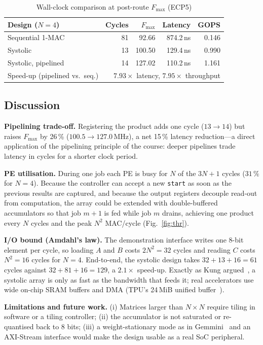 \documentclass[conference]{IEEEtran}
\begin{document}
\begin{table}[t]
\centering
\caption{Wall-clock comparison at post-route $F_{\max}$ (ECP5)}
\label{tab:wall}
\setlength{\tabcolsep}{3pt}
\begin{tabular}{@{}lrrrr@{}}
\toprule
Design ($N=4$) & Cycles & $F_{\max}$ & Latency & GOPS\\
\midrule
Sequential 1-MAC     & 81 & 92.66  & 874.2\,ns & 0.146\\
Systolic             & 13 & 100.50 & 129.4\,ns & 0.990\\
Systolic, pipelined  & 14 & 127.02 & 110.2\,ns & 1.161\\
\midrule
Speed-up (pipelined vs.\ seq.) & \multicolumn{4}{r}{$7.93\times$ latency, $7.95\times$ throughput}\\
\bottomrule
\end{tabular}
\end{table}

\subsection{Discussion}\label{sec:disc}
\textbf{Pipelining trade-off.} Registering the product adds one cycle
($13\to14$) but raises $F_{\max}$ by 26\,\% ($100.5\to127.0$\,MHz), a net
15\,\% latency reduction---a direct application of the pipelining principle
of the course: deeper pipelines trade latency in cycles for a shorter clock
period.

\textbf{PE utilisation.} During one job each PE is busy for $N$ of the
$3N+1$ cycles ($31\,\%$ for $N=4$). Because the controller can accept a new
\texttt{start} as soon as the previous results are captured, and because
the output registers decouple read-out from computation, the array could be
extended with double-buffered accumulators so that job $m+1$ is fed while job
$m$ drains, achieving one product every $N$ cycles and the peak $N^2$
MAC/cycle (Fig.~\ref{fig:thr}).

\textbf{I/O bound (Amdahl's law).} The demonstration interface writes one
8-bit element per cycle, so loading $A$ and $B$ costs $2N^2=32$ cycles and
reading $C$ costs $N^2=16$ cycles for $N=4$. End-to-end, the systolic
design takes $32+13+16=61$ cycles against $32+81+16=129$, a $2.1\times$
speed-up. Exactly as Kung argued~\cite{kung1982why}, a systolic array is only
as fast as the bandwidth that feeds it; real accelerators use wide on-chip
SRAM buffers and DMA (TPU's 24\,MiB unified buffer~\cite{jouppi2017tpu}).


\textbf{Limitations and future work.} (i) Matrices larger than $N\times N$
require tiling in software or a tiling controller; (ii) the accumulator is not
saturated or re-quantised back to 8 bits; (iii) a weight-stationary mode as
in Gemmini~\cite{genc2021gemmini} and an AXI-Stream interface would make the
design usable as a real SoC peripheral.
\end{document}
